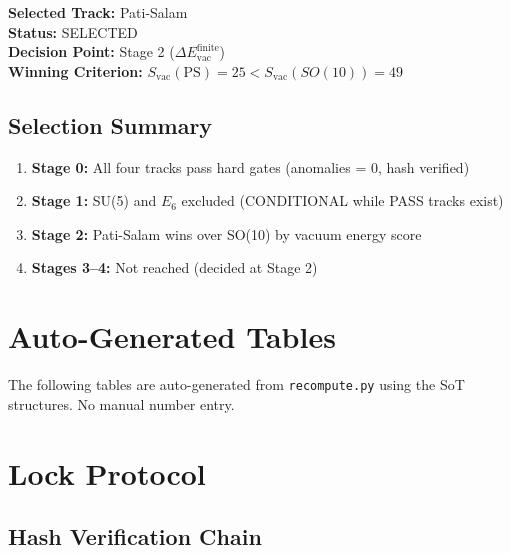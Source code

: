 \documentclass[11pt,a4paper]{article}
\begin{document}
\begin{tcolorbox}[colback=green!5!white,colframe=green!60!black,title=\textbf{FINAL SELECTION}]
\textbf{Selected Track:} Pati-Salam \\[0.5em]
\textbf{Status:} SELECTED \\[0.5em]
\textbf{Decision Point:} Stage 2 ($\Delta E_{\text{vac}}^{\text{finite}}$) \\[0.5em]
\textbf{Winning Criterion:} $S_{\text{vac}}(\text{PS}) = 25 < S_{\text{vac}}(SO(10)) = 49$
\end{tcolorbox}

\subsection{Selection Summary}
\label{subsec:selection-summary}

\begin{enumerate}
\item \textbf{Stage 0:} All four tracks pass hard gates (anomalies = 0, hash verified)
\item \textbf{Stage 1:} SU(5) and $E_6$ excluded (CONDITIONAL while PASS tracks exist)
\item \textbf{Stage 2:} Pati-Salam wins over SO(10) by vacuum energy score
\item \textbf{Stages 3--4:} Not reached (decided at Stage 2)
\end{enumerate}

\section{Auto-Generated Tables}
\label{sec:tables}

The following tables are auto-generated from \texttt{recompute.py} using
the SoT structures. No manual number entry.



\section{Lock Protocol}
\label{sec:lock}

\subsection{Hash Verification Chain}
\label{subsec:hash-chain}
\end{document}
